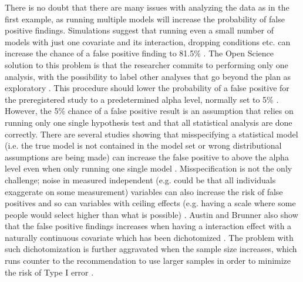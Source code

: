 There is no doubt that there are many issues with analyzing the data as in the first example, as running multiple models will increase the probability of false positive findings. Simulations suggest that running even a small number of models with just one covariate and its interaction, dropping conditions etc. can increase the chance of a false positive finding to 81.5\% \citep{Simmons2011}. The Open Science solution to this problem is that the researcher commits to performing only one analysis, with the possibility to label other analyses that go beyond the plan as exploratory \citep{Nosek2018}. This procedure should lower the probability of a false positive for the preregistered study to a predetermined alpha level, normally set to 5\% \citep{Moore2016}. However, the 5\% chance of a false positive result is an assumption that relies on running only one single hypothesis test and that all statistical analysis are done correctly. There are several studies showing that misspecifying a  statistical model (i.e. the true model is not contained in the model set or wrong distributional assumptions are being made) can increase the false positive to above the alpha level even when only running one single model \citep{Dennis2019,Litiere2007}. Misspecification is not the only challenge; noise in measured independent (e.g. could be that all individuals exaggerate on some measurement) variables can also increase the risk of false positives \citep{Brunner2009} and so can variables with ceiling effects (e.g. having a scale where some people would select higher than what is possible) \citep{Austin2003}. Austin and Brunner also show that the  false positive findings increases when having a interaction effect with a naturally continuous covariate which has been dichotomized \citep{Austin2004}. The problem with such dichotomization is further aggravated when the sample size increases, which runs counter to the recommendation to use larger samples in order to minimize the risk of Type I error \citep{Simmons2011}. 
\\
